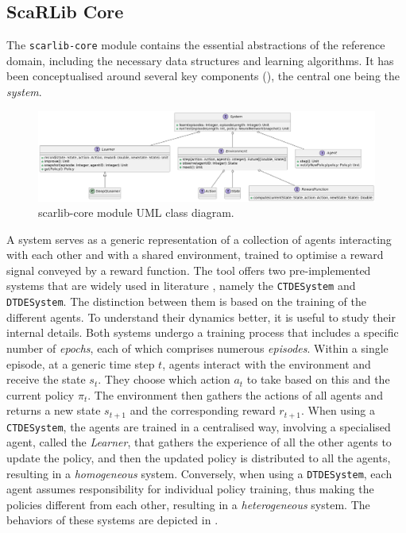 \documentclass[12pt,a4paper,openright,twoside]{book}
\begin{document}
\subsection*{ScaRLib Core}

The \texttt{scarlib-core} module contains the essential abstractions of the reference domain, including the necessary data structures 
    and learning algorithms. It has been conceptualised around several key components (), the central one being the \emph{system}.
    \begin{figure}[t]
        \centering
        \includegraphics[width=\textwidth]{figures/uml-core.png}
        \caption{scarlib-core module UML class diagram.}
        \label{fig:uml-core}
    \end{figure}
    A system serves as a generic representation of a collection of agents interacting with each other and with a shared 
    environment, trained to optimise a reward signal conveyed by a reward function. The tool offers two pre-implemented 
    systems that are widely used in literature \cite{Du2020}, namely the \texttt{CTDESystem} and \texttt{DTDESystem}. The distinction between them is based
    on the training of the different agents. To understand their dynamics better, it is useful to study their internal details. 
    Both systems undergo a training process that includes a specific number of \emph{epochs}, each of which comprises numerous \emph{episodes}. 
    Within a single episode, at a generic time step $t$, agents interact with the environment and receive the state $s_t$. 
    They choose which action $a_t$ to take based on this and the current policy $\pi_t$. The environment then gathers the 
    actions of all agents and returns a new state $s_{t+1}$ and the corresponding reward $r_{t+1}$. 
    When using a \texttt{CTDESystem}, the agents are trained in a centralised way, involving a specialised agent, called the \emph{Learner}, 
    that gathers the experience of all the other agents to update the policy, and then the updated policy is distributed to all 
    the agents,  resulting in a \emph{homogeneous} system. 
    Conversely, when using a \texttt{DTDESystem}, each agent assumes responsibility for individual policy training,
    thus making the policies different from each other, resulting in a \emph{heterogeneous} system. 
    The behaviors of these systems are depicted in .
    
\end{document}
